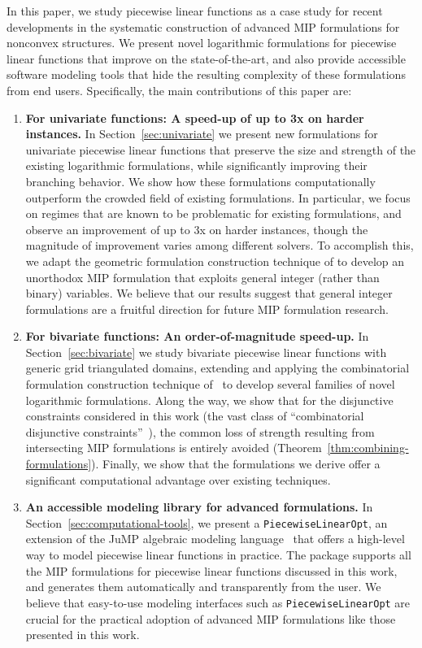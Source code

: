 \documentclass[opre,nonblindrev]{informs3} %
\newcommand{\blue}[1]{{#1}}
\begin{document}
In this paper, we study piecewise linear functions as a case study for recent developments in the systematic construction of advanced MIP formulations for nonconvex structures. We present novel logarithmic formulations for piecewise linear functions that improve on the state-of-the-art, and also provide accessible software modeling tools that hide the resulting complexity of these formulations from end users. Specifically, the main contributions of this paper are:
\begin{enumerate}
	\item \blue{\textbf{For univariate functions: A speed-up of up to 3x on harder instances.} In Section~\ref{sec:univariate} we present new formulations for univariate piecewise linear functions that preserve the size and strength of the existing logarithmic formulations, while significantly improving their branching behavior. We show how these formulations computationally outperform the crowded field of existing formulations. In particular, we focus on regimes that are known to be problematic for existing formulations, and observe an improvement of up to 3x on harder instances, though the magnitude of improvement varies among different solvers. To accomplish this, we adapt the geometric formulation construction technique of \cite{Vielma:2016} to develop an unorthodox MIP formulation that exploits general integer (rather than binary) variables. We believe that our results suggest that general integer formulations are a fruitful direction for future MIP formulation research.}

	\item \textbf{For bivariate functions: An order-of-magnitude speed-up.} In Section~\ref{sec:bivariate} we study bivariate piecewise linear functions with generic grid triangulated domains, extending and applying the combinatorial formulation construction technique of~\cite{Huchette:2016a} to develop several families of novel logarithmic formulations. Along the way, we show that for the disjunctive constraints considered in this work (the vast class of ``combinatorial disjunctive constraints''~\citep{Huchette:2016a}), the common loss of strength resulting from intersecting MIP formulations is entirely avoided (Theorem~\ref{thm:combining-formulations}). Finally, we show that the formulations we derive offer a significant computational advantage over existing techniques.

     \item {\bf An accessible modeling library for advanced formulations.} In Section~\ref{sec:computational-tools}, we present a \texttt{PiecewiseLinearOpt}, an extension of the JuMP algebraic modeling language~\citep{Dunning:2015a} that offers a high-level way to model piecewise linear functions in practice. The package supports all the MIP formulations for piecewise linear functions discussed in this work, and generates them automatically and transparently from the user. We believe that easy-to-use modeling interfaces such as \texttt{PiecewiseLinearOpt} are crucial for the practical adoption of advanced MIP formulations like those presented in this work.
\end{enumerate}
\end{document}
